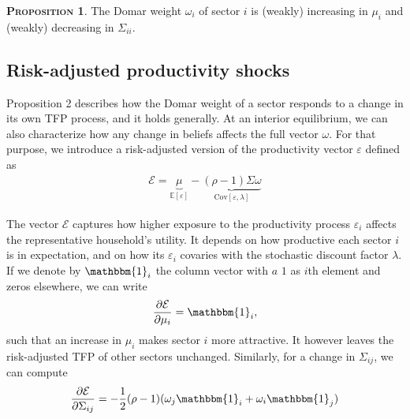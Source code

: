 \documentclass[11pt]{article}
\theoremstyle{definition}
\newtheorem{prop}{\noindent \textbf{\textsc{Proposition}}}
\begin{document}
	\begin{prop}
		The Domar weight $\omega_i$ of sector $i$ is (weakly) increasing in $\mu_i$ and (weakly) decreasing in $\Sigma_{ii}$.
	\end{prop}
	
	\subsection*{Risk-adjusted productivity shocks}
	Proposition 2 describes how the Domar weight of a sector responds to a change in its own TFP process, and it holds generally. At an interior equilibrium, we can also characterize how any change in beliefs affects the full vector $\omega$. For that purpose, we introduce a risk-adjusted version of the productivity vector $\varepsilon$ defined as
	\begin{align}
		\mathcal{E} = \underbrace{\mu}\limits_{\mathbb{E}[\varepsilon]} - \underbrace{(\rho-1)\Sigma\omega}\limits_{\text{Cov}[\varepsilon,\lambda]} \label{eq-27}
	\end{align}
	
	The vector $\mathcal{E}$ captures how higher exposure to the productivity process $\varepsilon_i$ affects the representative household’s utility. It depends on how productive each sector $i$ is in expectation, and on how its $\varepsilon_i$ covaries with the stochastic discount factor $\lambda$. If we denote by $\mathbbm{1}_i$ the column vector with $a$ $1$ as $i$th element and zeros elsewhere, we can write
	\begin{align}
		\frac{\partial \mathcal{E}}{\partial\mu_i} = \mathbbm{1}_i,\label{eq-28}
	\end{align}
	such that an increase in $\mu_i$ makes sector $i$ more attractive. It however leaves the risk-adjusted TFP of other sectors unchanged. Similarly, for a change in $\Sigma_{ij}$, we can compute
	\begin{align}
		\frac{\partial \mathcal{E}}{\partial\Sigma_{ij}} = - \frac{1}{2}(\rho-1) (\omega_j\mathbbm{1}_i + \omega_i\mathbbm{1}_j) \label{eq-29} 
	\end{align}
	
	
	
	
	
	
	
	
	
	
\end{document}
